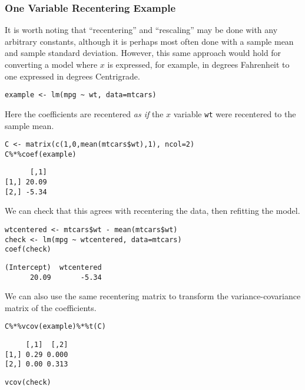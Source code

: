 \documentclass[]{article}
\begin{document}
\subsubsection{One Variable Recentering
Example}\label{one-variable-recentering-example}

It is worth noting that ``recentering'' and ``rescaling'' may be done
with any arbitrary constants, although it is perhaps most often done
with a sample mean and sample standard deviation. However, this same
approach would hold for converting a model where \(x\) is expressed, for
example, in degrees Fahrenheit to one expressed in degrees Centrigrade.

\begin{verbatim}
example <- lm(mpg ~ wt, data=mtcars)
\end{verbatim}

Here the coefficients are recentered \emph{as if} the \(x\) variable
\texttt{wt} were recentered to the sample mean.

\begin{verbatim}
C <- matrix(c(1,0,mean(mtcars$wt),1), ncol=2)
C%*%coef(example)
\end{verbatim}

\begin{verbatim}
      [,1]
[1,] 20.09
[2,] -5.34
\end{verbatim}

We can check that this agrees with recentering the data, then refitting
the model.

\begin{verbatim}
wtcentered <- mtcars$wt - mean(mtcars$wt)
check <- lm(mpg ~ wtcentered, data=mtcars)
coef(check)
\end{verbatim}

\begin{verbatim}
(Intercept)  wtcentered 
      20.09       -5.34 
\end{verbatim}

We can also use the same recentering matrix to transform the
variance-covariance matrix of the coefficients.

\begin{verbatim}
C%*%vcov(example)%*%t(C)
\end{verbatim}

\begin{verbatim}
     [,1]  [,2]
[1,] 0.29 0.000
[2,] 0.00 0.313
\end{verbatim}

\begin{verbatim}
vcov(check)
\end{verbatim}
\end{document}
